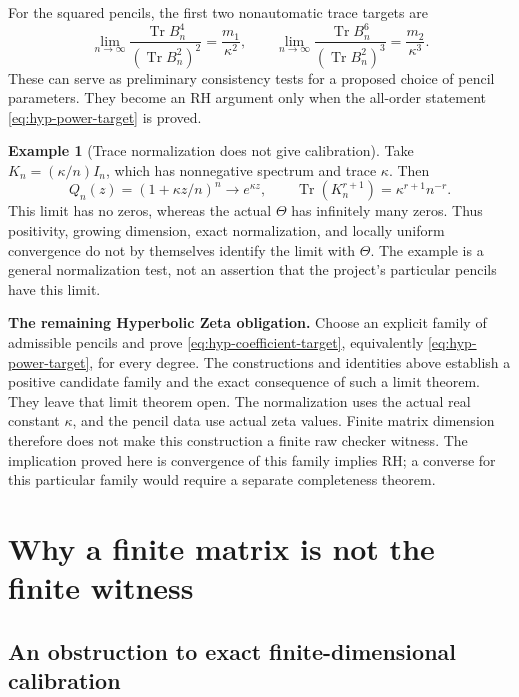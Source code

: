 \documentclass[11pt,a4paper]{article}
\numberwithin{equation}{section}
\theoremstyle{definition}
\newtheorem{example}[theorem]{Example}
\theoremstyle{remark}
\DeclareMathOperator{\Tr}{Tr}
\begin{document}
For the squared pencils, the first two nonautomatic trace targets are
\begin{equation}\label{eq:hyp-first-trace-targets}
\lim_{n\to\infty}
 \frac{\Tr B_n^4}{(\Tr B_n^2)^2}=\frac{m_1}{\kappa^2},
\qquad
\lim_{n\to\infty}
 \frac{\Tr B_n^6}{(\Tr B_n^2)^3}=\frac{m_2}{\kappa^3}.
\end{equation}
These can serve as preliminary consistency tests for a proposed choice
of pencil parameters. They become an RH argument only when the
all-order statement \eqref{eq:hyp-power-target} is proved.

\begin{example}[Trace normalization does not give calibration]
Take $K_n=(\kappa/n)I_n$, which has nonnegative spectrum and trace
$\kappa$. Then
\[
Q_n(z)=(1+\kappa z/n)^n\longrightarrow e^{\kappa z},\qquad
\Tr(K_n^{r+1})=\kappa^{r+1}n^{-r}.
\]
This limit has no zeros, whereas the actual $\Theta$ has infinitely
many zeros. Thus positivity, growing dimension, exact normalization,
and locally uniform convergence do not by themselves identify the
limit with $\Theta$. The example is a general normalization test,
not an assertion that the project's particular pencils have this limit.
\end{example}

\begin{scopebox}
\small\textbf{The remaining Hyperbolic Zeta obligation.}
Choose an explicit family of admissible pencils and prove
\eqref{eq:hyp-coefficient-target}, equivalently
\eqref{eq:hyp-power-target}, for every degree. The constructions and
identities above establish a positive candidate family and the exact
consequence of such a limit theorem. They leave that limit theorem open.
The normalization uses the actual real constant $\kappa$, and the
pencil data use actual zeta values. Finite matrix dimension therefore
does not make this construction a finite raw checker witness.
The implication proved here is convergence of this family implies RH;
a converse for this particular family would require a separate
completeness theorem.
\end{scopebox}



\section[Finite matrices and witnesses]{Why a finite matrix is not the finite witness}\label{sec:finite}

\subsection{An obstruction to exact finite-dimensional calibration}
\end{document}

